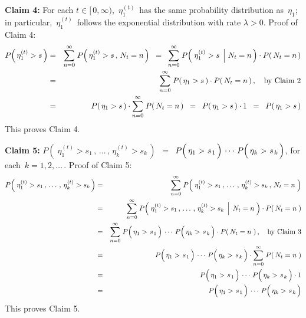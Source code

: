 \vskip 0.5cm
\noindent
\textbf{Claim 4:}\quad
For each $t \in [\,0,\infty)$,
\,$\eta^{(t)}_{1}$\, has the same probability distribution as \,$\eta_{1}$;\,
in particular, \,$\eta^{(t)}_{1}$\, follows the exponential distribution with rate $\lambda > 0$.
\vskip 0.2cm
\noindent
Proof of Claim 4:\quad
\begin{eqnarray*}
P\!\left(\,\eta^{(t)}_{1} > s\,\right)
&=&
	\overset{\infty}{\underset{n = 0}{\sum}}\;P\!\left(\,\eta^{(t)}_{1} > s\,,\,N_{t} = n\,\right)
\;\; = \;\;
	\overset{\infty}{\underset{n = 0}{\sum}}\;
	P\!\left(\,\left.\eta^{(t)}_{1} > s\,\;\right\vert\, N_{t} = n\,\right)
	\cdot
	P\!\left(\,N_{t} = n\,\right)
\\
&=&
	\overset{\infty}{\underset{n = 0}{\sum}}\;
	P\!\left(\,\eta_{1} > s\,\right)
	\cdot
	P\!\left(\,N_{t} = n\,\right),
	\quad
	\textnormal{by Claim 2}
\\
&=&
	P\!\left(\,\eta_{1} > s\,\right)
	\cdot
	\overset{\infty}{\underset{n = 0}{\sum}}\; P\!\left(\,N_{t} = n\,\right)
\;\; = \;\;
	P\!\left(\,\eta_{1} > s\,\right) \cdot 1
\;\; = \;\;
	P\!\left(\,\eta_{1} > s\,\right)
\end{eqnarray*}
This proves Claim 4.


\vskip 0.5cm
\noindent
\textbf{Claim 5:}\quad
$P\!\left(\;\eta^{(t)}_{1} > s_{1} \,,\, \ldots \,,\, \eta^{(t)}_{k} > s_{k} \,\right)$
\,$=$\,
$P\!\left(\,\eta_{1} > \overset{{\color{white}-}}{s}_{1}\,\right) \,\cdots\, P\!\left(\,\eta_{k} > \overset{{\color{white}-}}{s}_{k}\,\right)$,\;\;
for each \,$k = 1, 2, \ldots$\,.
\vskip 0.2cm
\noindent
Proof of Claim 5:\quad
\begin{eqnarray*}
P\!\left(\;\eta^{(t)}_{1} > s_{1} \,,\, \ldots \,,\, \eta^{(t)}_{k} > s_{k} \,\right)
& = &
	\overset{\infty}{\underset{n=0}{\sum}}\;
	P\!\left(\;\eta^{(t)}_{1} > s_{1} \,,\, \ldots \,,\, \eta^{(t)}_{k} > s_{k} \,,\, N_{t} = n\;\right)
\\
& = &
	\overset{\infty}{\underset{n=0}{\sum}}\;
	P\!\left(\,\left.\eta^{(t)}_{1} > s_{1} \,,\, \ldots \,,\, \eta^{(t)}_{k} > s_{k} \,\;\right\vert\; N_{t} = n\;\right)
	\cdot
	P\!\left(\,N_{t} = n\;\right)
\\
& = &
	\overset{\infty}{\underset{n=0}{\sum}}\;
	P\!\left(\,\eta_{1} > \overset{{\color{white}-}}{s}_{1}\,\right) \,\cdots\, P\!\left(\,\eta_{k} > \overset{{\color{white}-}}{s}_{k}\,\right)
	\cdot
	P\!\left(\,N_{t} = n\;\right),
	\quad
	\textnormal{by Claim 3}
\\
& = &
	P\!\left(\,\eta_{1} > \overset{{\color{white}-}}{s}_{1}\,\right) \,\cdots\, P\!\left(\,\eta_{k} > \overset{{\color{white}-}}{s}_{k}\,\right)
	\cdot
	\overset{\infty}{\underset{n=0}{\sum}}\; P\!\left(\,N_{t} = n\;\right)
\\
& = &
	P\!\left(\,\eta_{1} > \overset{{\color{white}-}}{s}_{1}\,\right) \,\cdots\, P\!\left(\,\eta_{k} > \overset{{\color{white}-}}{s}_{k}\,\right)
	\cdot 1
\\
& = &
	P\!\left(\,\eta_{1} > \overset{{\color{white}-}}{s}_{1}\,\right) \,\cdots\, P\!\left(\,\eta_{k} > \overset{{\color{white}-}}{s}_{k}\,\right)
\end{eqnarray*}
This proves Claim 5.

